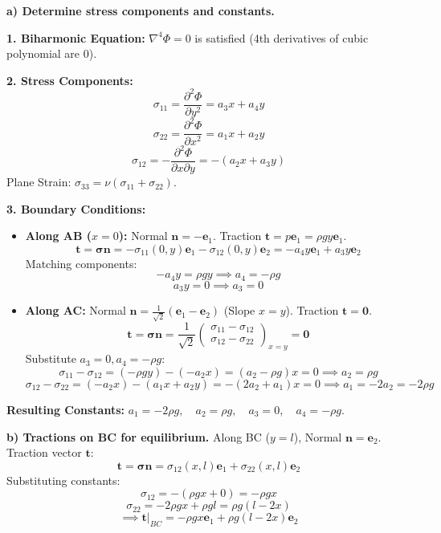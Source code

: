 \documentclass[10pt,twocolumn, a4paper]{article}
\begin{document}
\textbf{a) Determine stress components and constants.}

\textbf{1. Biharmonic Equation:}
$\nabla^4 \Phi = 0$ is satisfied (4th derivatives of cubic polynomial are 0).

\textbf{2. Stress Components:}
\[ \sigma_{11} = \frac{\partial^2 \Phi}{\partial y^2} = a_3 x + a_4 y \]
\[ \sigma_{22} = \frac{\partial^2 \Phi}{\partial x^2} = a_1 x + a_2 y \]
\[ \sigma_{12} = -\frac{\partial^2 \Phi}{\partial x \partial y} = -(a_2 x + a_3 y) \]
Plane Strain: $\sigma_{33} = \nu(\sigma_{11} + \sigma_{22})$.

\textbf{3. Boundary Conditions:}
\begin{itemize}
    \item \textbf{Along AB ($x=0$):} Normal $\bm{n} = -\bm{e}_1$. Traction $\bm{t} = p \bm{e}_1 = \rho g y \bm{e}_1$.
    \[ \bm{t} = \bm{\sigma} \bm{n} = -\sigma_{11}(0,y)\bm{e}_1 - \sigma_{12}(0,y)\bm{e}_2 = -a_4 y \bm{e}_1 + a_3 y \bm{e}_2 \]
    Matching components:
    \[ -a_4 y = \rho g y \implies a_4 = -\rho g \]
    \[ a_3 y = 0 \implies a_3 = 0 \]

    \item \textbf{Along AC:} Normal $\bm{n} = \frac{1}{\sqrt{2}}(\bm{e}_1 - \bm{e}_2)$ (Slope $x=y$). Traction $\bm{t} = \bm{0}$.
    \[ \bm{t} = \bm{\sigma} \bm{n} = \frac{1}{\sqrt{2}} \begin{pmatrix} \sigma_{11} - \sigma_{12} \\ \sigma_{12} - \sigma_{22} \end{pmatrix}_{x=y} = \bm{0} \]
    Substitute $a_3=0, a_4=-\rho g$:
    \[ \sigma_{11} - \sigma_{12} = (-\rho g y) - (-a_2 x) = (a_2-\rho g)x = 0 \implies a_2 = \rho g \]
    \[ \sigma_{12} - \sigma_{22} = (-a_2 x) - (a_1 x + a_2 y) = -(2a_2 + a_1)x = 0 \implies a_1 = -2a_2 = -2\rho g \]
\end{itemize}
\textbf{Resulting Constants:}
$a_1 = -2\rho g, \quad a_2 = \rho g, \quad a_3 = 0, \quad a_4 = -\rho g$.

\textbf{b) Tractions on BC for equilibrium.}
Along BC ($y=l$), Normal $\bm{n} = \bm{e}_2$.
Traction vector $\bm{t}$:
\[ \bm{t} = \bm{\sigma} \bm{n} = \sigma_{12}(x,l)\bm{e}_1 + \sigma_{22}(x,l)\bm{e}_2 \]
Substituting constants:
\[ \sigma_{12} = -(\rho g x + 0) = -\rho g x \]
\[ \sigma_{22} = -2\rho g x + \rho g l = \rho g (l - 2x) \]
\[ \implies \bm{t}|_{BC} = -\rho g x \bm{e}_1 + \rho g (l - 2x) \bm{e}_2 \]
\end{document}
